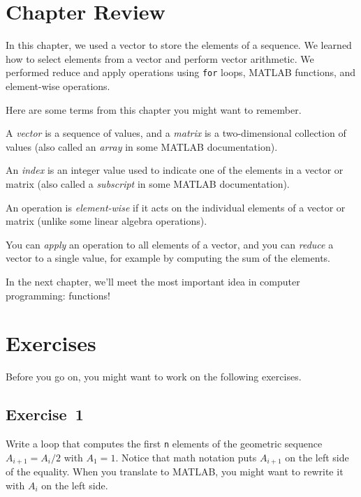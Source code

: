 \section{Chapter Review}

In this chapter, we used a vector to store the elements of a sequence.  We learned how to select elements from a vector and perform vector arithmetic.  We performed reduce and apply operations using \lstinline{for} loops, MATLAB functions, and element-wise operations.

Here are some terms from this chapter you might want to remember.


A {\em vector} is a sequence of values, and a {\em matrix} is a two-dimensional collection of values (also called an {\em array} in some MATLAB documentation).

An {\em index} is an integer value used to indicate one of the elements
in a vector or matrix (also called a {\em subscript} in some MATLAB documentation).

An operation is {\em element-wise} if it acts on the individual elements of a vector or matrix (unlike some linear algebra operations).

You can {\em apply} an operation to all elements of a vector, and you can {\em reduce} a vector to a single value, for example by computing the sum of the elements.


In the next chapter, we'll meet the most important idea in computer programming: functions!



\section{Exercises}

Before you go on, you might want to work on the following exercises.

\subsection{Exercise~1}
Write a loop that computes the first \lstinline{n} elements
of the geometric sequence $A_{i+1} = A_i/2$ with $A_1 = 1$.  Notice that
math notation puts $A_{i+1}$ on the left side of the equality.
When you translate to MATLAB, you might want to rewrite it with
$A_{i}$ on the left side.


